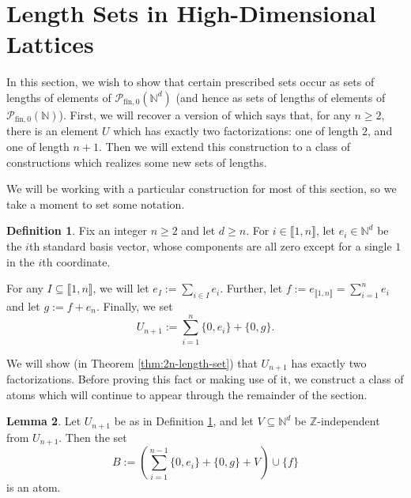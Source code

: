\documentclass{report}
\newcommand{\NN}{\mathbb{N}}
\renewcommand{\P}{\mathcal{P}}
\newcommand{\ZZ}{\mathbb{Z}}
\newcommand{\llb}{\llbracket}
\newcommand{\rrb}{\rrbracket}
\newcommand{\fin}{\textrm{fin}}
\newcommand{\fon}{{\textrm{fin}, 0}}
\renewcommand{\:}{\text{:}}
\newcommand{\PN}{{\P_{\fin,0}(\NN)}}
\theoremstyle{definition}
\newtheorem{defn}{Definition}[section]
\newtheorem{lemma}[defn]{Lemma}
\begin{document}
\section{Length Sets in High-Dimensional Lattices}
In this section, we wish to show that certain prescribed sets occur as sets of lengths of elements of $\P_\fon(\NN^d)$ (and hence as sets of lengths of elements of $\PN$).
First, we will recover a version of \cite[Proposition 4.10]{fan-tringali18} which says that, for any $n\ge 2$, there is an element $U$ which has exactly two factorizations: one of length $2$, and one of length $n+1$.
Then we will extend this construction to a class of constructions which realizes some new sets of lengths.

We will be working with a particular construction for most of this section, so we take a moment to set some notation.

\begin{defn} \label{def:two-fac-construction}
Fix an integer $n\ge 2$ and let $d\ge n$.
For $i\in \llb 1,n\rrb$, let $e_i \in \NN^d$ be the $i$th standard basis vector, whose components are all zero except for a single $1$ in the $i$th coordinate.

For any $I \subseteq \llb 1,n \rrb$, we will let $e_I := \sum_{i\in I} e_i$.
Further, let $f := e_{\llb 1,n \rrb} = \sum_{i=1}^n e_i$ and let $g := f + e_n$.
Finally, we set
\[U_{n+1} := \sum_{i=1}^n \{0,e_i\} + \{0,g\}.\]
\end{defn}

We will show (in Theorem \ref{thm:2n-length-set}) that $U_{n+1}$ has exactly two factorizations. 
Before proving this fact or making use of it, we construct a class of atoms which will continue to appear through the remainder of the section.

\begin{lemma} \label{lem:large-atom-two-fac}
Let $U_{n+1}$ be as in Definition \ref{def:two-fac-construction}, and let $V\subseteq \NN^d$ be $\ZZ$-independent from $U_{n+1}$.
Then the set
\[ B:= \left( \sum_{i=1}^{n-1} \{0,e_i\} + \{0,g\} + V \right) \cup \{f\} \]
is an atom.
\end{lemma}
\end{document}
